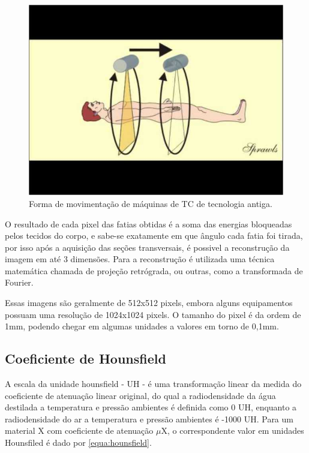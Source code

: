 \begin{figure}[ht]
 \begin{center}
  \includegraphics{imagens/tc2.jpg}
 \end{center}
 \caption{Forma de movimentação de máquinas de TC de tecnologia antiga.}
 \label{fig:tc2}
\end{figure}

O resultado de cada pixel das fatias obtidas é a soma das energias bloqueadas pelos tecidos do corpo, e sabe-se exatamente em que ângulo cada fatia foi tirada, por isso após a aquisição das seções transversais, é possivel a reconstrução da imagem em até 3 dimensões. Para a reconstrução é utilizada uma técnica matemática chamada de projeção retrógrada, ou outras, como a transformada de Fourier.


Essas imagens são geralmente de 512x512 pixels, embora alguns equipamentos possuam uma resolução de 1024x1024 pixels. O tamanho do pixel é da ordem de 1mm, podendo chegar em algumas unidades a valores em torno de 0,1mm.

\subsection{Coeficiente de Hounsfield}

A escala da unidade hounsfield - UH - é uma transformação linear da medida do coeficiente de atenuação linear original, do qual a radiodensidade da água destilada a temperatura e pressão ambientes é definida como 0 UH, enquanto a radiodensidade do ar a temperatura e pressão ambientes é -1000 UH. Para um material X com coeficiente de atenuação $\mu$X, o correspondente valor em unidades Hounsfiled é dado por \ref{equa:hounsfield}.


